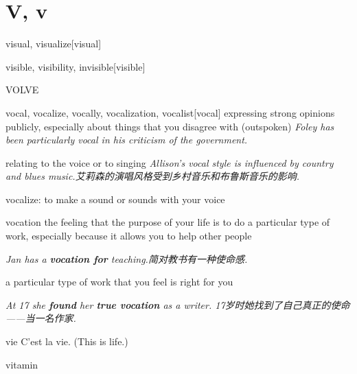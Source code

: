 \section{V, v}

\begin{DefWord}{visual, visualize}[visual]
\end{DefWord}

\begin{DefWord}{visible, visibility, invisible}[visible]
\end{DefWord}

\begin{DefWord}{VOLVE}
\end{DefWord}

\begin{DefWord}{vocal, vocalize, vocally, vocalization, vocalist}[vocal]
    expressing strong opinions publicly, especially about things that you disagree with (outspoken)
    \textit{Foley has been particularly vocal in his criticism of the government.}

    relating to the voice or to singing
    \textit{Allison's vocal style is influenced by country and blues music.艾莉森的演唱风格受到乡村音乐和布鲁斯音乐的影响. }

    vocalize: to make a sound or sounds with your voice
\end{DefWord}

\begin{DefWord}{vocation}
    the feeling that the purpose of your life is to do a particular type of work, especially because it allows you to help other people

    \textit{Jan has a \textbf{vocation for} teaching.简对教书有一种使命感. }

    a particular type of work that you feel is right for you

    \textit{At 17 she \textbf{found} her \textbf{true vocation} as a writer. 17岁时她找到了自己真正的使命——当一名作家. }
\end{DefWord}

\begin{DefWord}{vie}
    C'est la vie. (This is life.)
\end{DefWord}

\begin{DefWord}{vitamin}
\end{DefWord}


